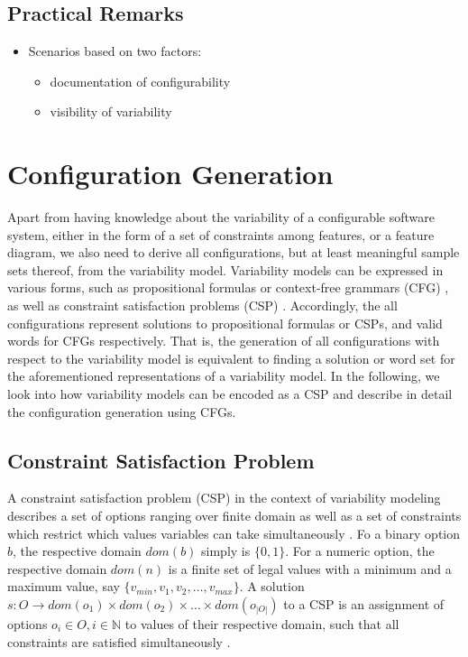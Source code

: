 \subsection{Practical Remarks}
\begin{itemize}
  \item Scenarios based on two factors:
  \begin{itemize}
    \item documentation of configurability
    \item visibility of variability
  \end{itemize}
\end{itemize}

\section{Configuration Generation}\label{sec:configuration_gen}
Apart from having knowledge about the variability of a configurable software
system, either in the form of a set of constraints among features, or a feature
diagram, we also need to derive all configurations, but at least meaningful
sample sets thereof, from the variability model. Variability models can be
expressed in various forms, such as propositional formulas or context-free
grammars (CFG) \citep{batory_feature_2005}, as well as constraint satisfaction
problems (CSP) \citep{benavides_automated_2005,benavides_using_2005}.
Accordingly, the all configurations represent solutions to propositional formulas or CSPs, and valid words for CFGs
respectively. That is, the generation of all configurations with respect to the
variability model is equivalent to finding a solution or word set for the
aforementioned representations of a variability model. In the following, we
look into how variability models can be encoded as a CSP and describe in detail
the configuration generation using CFGs.

\subsection{Constraint Satisfaction Problem}
A constraint satisfaction problem (CSP) in the context of variability modeling
describes a set of options ranging over finite domain as well as a set of
constraints which restrict which values variables can take simultaneously
\citep{benavides_automated_2005}. Fo a binary option $b$, the respective domain
$dom(b)$ simply is $\lbrace 0, 1\rbrace$.
For a numeric option, the respective domain $dom(n)$ is a finite set of legal
values with a minimum and a maximum value, say $\lbrace v_{min}, v_1,
v_2, \ldots, v_{max}\rbrace$.
A solution $s: O \rightarrow dom(o_1) \times dom(o_2) \times \ldots \times
dom(o_{|O|})$ to a CSP is an assignment of options $o_i \in O, i \in \mathbb{N}$
to values of their respective domain, such that all constraints are satisfied simultaneously \citep{benavides_automated_2005}.  

